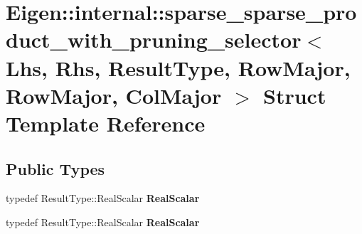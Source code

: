 \hypertarget{struct_eigen_1_1internal_1_1sparse__sparse__product__with__pruning__selector_3_01_lhs_00_01_rhs_e175d5ee5e029960308385b07451d28e}{}\section{Eigen\+:\+:internal\+:\+:sparse\+\_\+sparse\+\_\+product\+\_\+with\+\_\+pruning\+\_\+selector$<$ Lhs, Rhs, Result\+Type, Row\+Major, Row\+Major, Col\+Major $>$ Struct Template Reference}
\label{struct_eigen_1_1internal_1_1sparse__sparse__product__with__pruning__selector_3_01_lhs_00_01_rhs_e175d5ee5e029960308385b07451d28e}
\subsection*{Public Types}
\begin{DoxyCompactItemize}
\item 
\mbox{\label{struct_eigen_1_1internal_1_1sparse__sparse__product__with__pruning__selector_3_01_lhs_00_01_rhs_e175d5ee5e029960308385b07451d28e_a4dfe74a59534b6f3b637809e3197a3f0}} 
typedef Result\+Type\+::\+Real\+Scalar {\bfseries Real\+Scalar}
\item 
\mbox{\label{struct_eigen_1_1internal_1_1sparse__sparse__product__with__pruning__selector_3_01_lhs_00_01_rhs_e175d5ee5e029960308385b07451d28e_a4dfe74a59534b6f3b637809e3197a3f0}} 
typedef Result\+Type\+::\+Real\+Scalar {\bfseries Real\+Scalar}
\end{DoxyCompactItemize}
